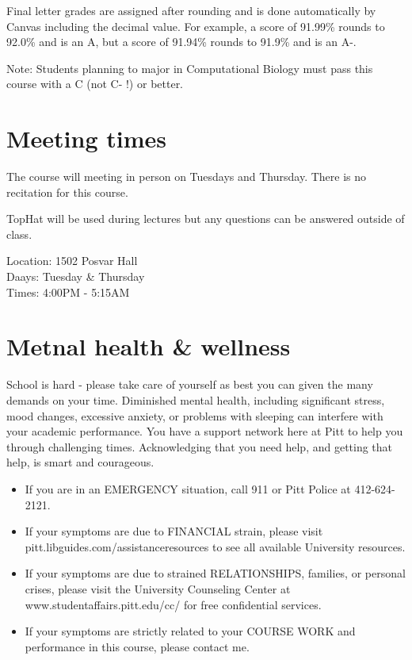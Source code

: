 \documentclass[
]{book}
\providecommand{\tightlist}{%
  \setlength{\itemsep}{0pt}\setlength{\parskip}{0pt}}
\begin{document}
Final letter grades are assigned after rounding and is done automatically by Canvas including the decimal value. For example, a score of 91.99\% rounds to 92.0\% and is an A, but a score of 91.94\% rounds to 91.9\% and is an A-.

Note: Students planning to major in Computational Biology must pass this course with a C (not C- !) or better.

\hypertarget{meeting-times-1}{%
\chapter{Meeting times}\label{meeting-times-1}}

The course will meeting in person on Tuesdays and Thursday. There is no recitation for this course.

TopHat will be used during lectures but any questions can be answered outside of class.

Location: 1502 Posvar Hall\\
Daays: Tuesday \& Thursday\\
Times: 4:00PM - 5:15AM

\hypertarget{metnal-health-wellness}{%
\chapter{Metnal health \& wellness}\label{metnal-health-wellness}}

School is hard - please take care of yourself as best you can given the many demands on your time. Diminished mental health, including significant stress, mood changes, excessive anxiety, or problems with sleeping can interfere with your academic performance. You have a support network here at Pitt to help you through challenging times. Acknowledging that you need help, and getting that help, is smart and courageous.

\begin{itemize}
\tightlist
\item
  If you are in an EMERGENCY situation, call 911 or Pitt Police at 412-624-2121.
\item
  If your symptoms are due to FINANCIAL strain, please visit pitt.libguides.com/assistanceresources to see all available University resources.
\item
  If your symptoms are due to strained RELATIONSHIPS, families, or personal crises, please visit the University Counseling Center at www.studentaffairs.pitt.edu/cc/ for free confidential services.
\item
  If your symptoms are strictly related to your COURSE WORK and performance in this course, please contact me.
\end{itemize}
\end{document}
